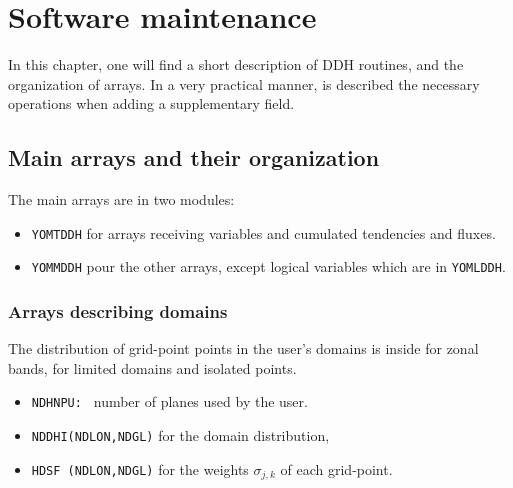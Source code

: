 \chapter{Software maintenance}
\null
\vspace{1cm}

In this chapter, one will find a short description of DDH routines, and the
organization of arrays. In a very practical manner, is described the necessary
operations when adding a supplementary field.


\section{Main arrays and their organization}

The main arrays are in two modules:
\begin{itemize}
\item {\tt YOMTDDH} \qquad for arrays receiving variables and cumulated tendencies and fluxes.

\item {\tt YOMMDDH} \qquad pour the other arrays, except logical variables which are in {\tt YOMLDDH}.
\end{itemize}

\subsection{Arrays describing domains}

The distribution of grid-point points in the user's domains is inside
 \quad for zonal bands,
 \quad for limited domains and isolated points.
\begin{itemize}
\item {\tt NDHNPU: } number of planes used by the user.
\item {\tt NDDHI(NDLON,NDGL)} \qquad for the domain distribution, 
\item {\tt HDSF (NDLON,NDGL)} \qquad for the weights $\sigma_{j,k}$ of each grid-point.
\end{itemize}

